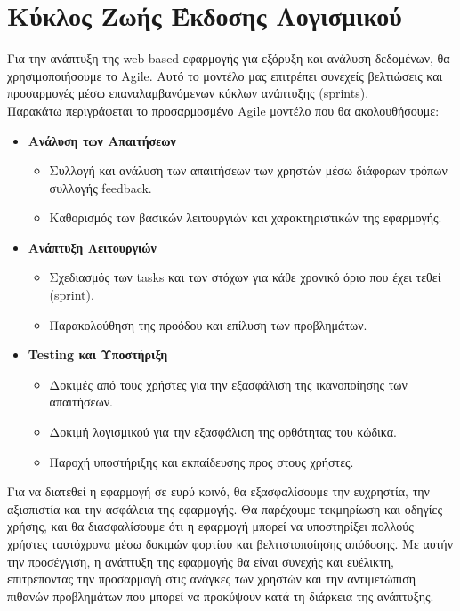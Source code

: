 \documentclass{article}
\begin{document}
{{{{{{\section{Κύκλος Ζωής Έκδοσης Λογισμικού}
Για την ανάπτυξη της web-based εφαρμογής για εξόρυξη και ανάλυση δεδομένων, θα χρησιμοποιήσουμε το Agile. Αυτό το μοντέλο μας επιτρέπει συνεχείς βελτιώσεις και προσαρμογές μέσω επαναλαμβανόμενων κύκλων ανάπτυξης (sprints).\\ Παρακάτω περιγράφεται το προσαρμοσμένο Agile μοντέλο που θα ακολουθήσουμε:
\begin{itemize}
    \item \textbf{Ανάλυση των Απαιτήσεων}
        \begin{itemize}
            \item Συλλογή και ανάλυση των απαιτήσεων των χρηστών μέσω διάφορων τρόπων συλλογής feedback.
            \item {}Καθορισμός των βασικών λειτουργιών και χαρακτηριστικών της εφαρμογής.
        \end{itemize}
    \item \textbf{Ανάπτυξη Λειτουργιών}
        \begin{itemize}
            \item Σχεδιασμός των tasks και των στόχων για κάθε χρονικό όριο που έχει τεθεί (sprint).
            \item Παρακολούθηση της προόδου και επίλυση των προβλημάτων.
        \end{itemize}
    \item \textbf{Testing και Υποστήριξη}
        \begin{itemize}
            \item Δοκιμές από τους χρήστες για την εξασφάλιση της ικανοποίησης των απαιτήσεων.
            \item Δοκιμή λογισμικού για την εξασφάλιση της ορθότητας του κώδικα.
            \item Παροχή υποστήριξης και εκπαίδευσης προς στους χρήστες.
        \end{itemize}
\end{itemize}
\vspace{0.3 cm}
Για να διατεθεί η εφαρμογή σε ευρύ κοινό, θα εξασφαλίσουμε την ευχρηστία, την αξιοπιστία και την ασφάλεια της εφαρμογής. Θα παρέχουμε τεκμηρίωση και οδηγίες χρήσης, και θα διασφαλίσουμε ότι η εφαρμογή μπορεί να υποστηρίξει πολλούς χρήστες ταυτόχρονα μέσω δοκιμών φορτίου και βελτιστοποίησης απόδοσης.
Με αυτήν την προσέγγιση, η ανάπτυξη της εφαρμογής θα είναι συνεχής και ευέλικτη, επιτρέποντας την προσαρμογή στις ανάγκες των χρηστών και την αντιμετώπιση πιθανών προβλημάτων που μπορεί να προκύψουν κατά τη διάρκεια της ανάπτυξης.

}}}}}}
\end{document}
